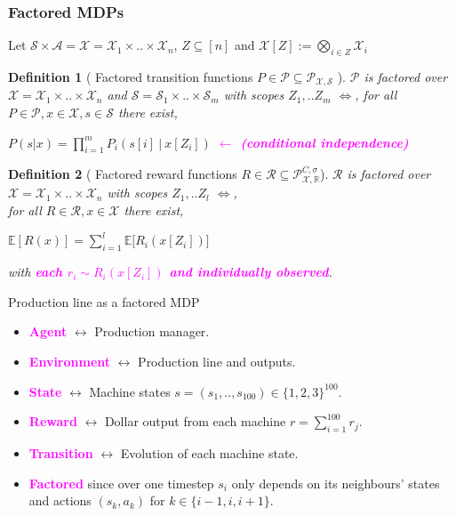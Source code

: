 \documentclass{beamer}
\newlength{\wideitemsep}
\let\olditem\item
\renewcommand{\item}{\setlength{\itemsep}{\wideitemsep}\olditem}
\newtheorem{mydef}{Definition}
\newcommand{\Exp}{\mathds{E}}
\newcommand{\Real}{\mathds{R}}
\newcommand{\Xc}{\mathcal{X}}
\newcommand{\Pc}{\mathcal{P}}
\newcommand{\Rc}{\mathcal{R}}
\newcommand{\Sc}{\mathcal{S}}
\newcommand{\Ac}{\mathcal{A}}
\newcommand{\bspace}{\vspace{3mm}}
\newcommand{\hilite}[1]{\textcolor{magenta}{\textbf{#1}}}
\begin{document}
\begin{frame}
\frametitle{Factored MDPs}
Let $\Sc \times \Ac = \Xc = \Xc_1 \times .. \times \Xc_n$, $Z \subseteq [n]$ and
$ \Xc[Z] := \bigotimes\limits_{i \in Z} \Xc_i $

\begin{mydef}[ Factored transition functions $P \in \Pc \subseteq \Pc_{\Xc,\Sc}$ ]
$\Pc$ is factored over $\Xc = \Xc_1 \times .. \times \Xc_n$ and $\Sc = \Sc_1 \times .. \times \Sc_m$ with scopes  $Z_1, .. Z_m$ $\iff$,
for all $P \in \Pc, x \in \Xc, s \in \Sc$ there exist,
\begin{center}
$ P(s | x) = \prod_{i=1}^m P_i \left( s[i] \ \bigg\vert \ x[Z_i] \right) $
\hilite{$\leftarrow$ (conditional independence)}
\end{center}
\end{mydef}

\begin{mydef}[ Factored reward functions $R \in \Rc \subseteq \Pc^{C,\sigma}_{\Xc,\Real} $]
$\Rc$ is factored over $\Xc = \Xc_1 \times .. \times \Xc_n $ with scopes $Z_1, .. Z_l$ $\iff$, \\
for all $R \in \Rc, x \in \Xc$ there exist,
\begin{center}
$ \Exp [ R(x) ] = \sum_{i=1}^l \Exp\big[ R_i(x[Z_i]) \big] $
\end{center}
with \hilite{each $r_i \sim R_i(x[Z_i])$ and individually observed}.
\end{mydef}
\end{frame}


\begin{frame}{Production line as a factored MDP}
\begin{itemize}
    \item \hilite{Agent} $\leftrightarrow$ Production manager.
    \bspace
    \item \hilite{Environment} $\leftrightarrow$ Production line and outputs.
    \bspace
    \item \hilite{State} $\leftrightarrow$ Machine states $s = (s_1, .., s_{100}) \in \{1, 2, 3\}^{100}$.
    \bspace
    \item \hilite{Reward} $\leftrightarrow$ Dollar output from each machine $r = \sum_{i=1}^{100} r_j$.
    \bspace
    \item \hilite{Transition} $\leftrightarrow$ Evolution of each machine state.
    \pause
    \item \hilite{Factored} since over one timestep $s_i$ only depends on its neighbours' states and actions $(s_k, a_k)$ for $k \in \{i-1, i, i+1\}$.
\end{itemize}
\end{frame}
\end{document}
